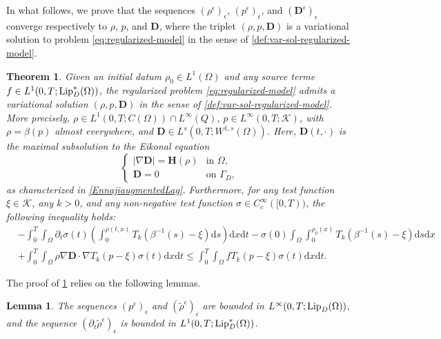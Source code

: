 \documentclass[final,reqno]{amsart}
\theoremstyle{plain}
\newtheorem{theorem}{Theorem}	%
\newtheorem{lemma}{Lemma}	%
\theoremstyle{definition}
\theoremstyle{remark}
\numberwithin{remark}{section}	%
\numberwithin{example}{section}	%
\newcommand{\de}{\mathbf{D}}
\newcommand{\he}{\mathbf{H}}
\newcommand{\K}{\mathcal K}
\newcommand{\Om}{\Omega}
\newcommand{\Lip}{\textup{Lip}}
\newcommand{\dd}{\mathrm{d}}
\begin{document}
In what follows, we prove that the sequences $(\rho^\epsilon)_{\epsilon}$, $(p^\epsilon)_{\epsilon}$, and $(\de^\epsilon)_{\epsilon}$ converge respectively to $\rho$, $p$, and $\de$, where the triplet $(\rho,p,\de)$ is a variational solution to problem \eqref{eq:regularized-model} in the sense of \cref{def:var-sol-regularized-model}.
\begin{theorem}\label{thm:th2}
     Given an initial datum $\rho_0\in L^{1}(\Om)$ and any source terme $f\in L^{1}(0,T;\Lip_{D}^{*}(\Om))$, the regularized problem \eqref{eq:regularized-model} admits a variational solution $(\rho, p, \de)$ in the sense of \cref{def:var-sol-regularized-model}. More precisely, $\rho \in L^1(0,T; C(\Omega)) \cap L^\infty(Q)$, $p \in L^\infty(0,T; \K)$, with $\rho = \beta(p)$ almost everywhere, and $\de \in L^s(0,T; W^{1,s}(\Omega))$. 
    Here, $\de(t, \cdot)$ is the maximal subsolution to the Eikonal equation
    \begin{equation}\label{eq:eikonal}
        \begin{cases}
            \vert \nabla \de \vert = \he(\rho) & \text{in } \Om,\\
            \de = 0 & \text{on } \Gamma_D,
        \end{cases}
    \end{equation}
    as characterized in \cref{EnnajiaugmentedLag}. Furthermore, for any test function $\xi \in \K$, any $k > 0$, and any non-negative test function $\sigma \in C^{\infty}_{c}([0,T))$, the following inequality holds:
    \begin{equation}\label{eq:evol1}
        \begin{aligned}
            &-\int_{0}^{T} \int_{\Omega} \partial_t \sigma(t) \left( \int_{0}^{\rho(t,x)} T_k(\beta^{-1}(s)-\xi) \dd s \right) \dd x \dd t - \sigma(0) \int_{\Omega}\int_{0}^{\rho_0(x)} T_k(\beta^{-1}(s)-\xi) \dd s \dd x\\
            &+ \int_{0}^{T} \int_{\Omega} \rho \nabla \de \cdot \nabla T_k(p-\xi) \sigma(t) \dd x \dd t \le \int_{0}^{T} \int_{\Om} f T_k(p-\xi) \sigma(t) \dd x \dd t.
        \end{aligned}
    \end{equation}
\end{theorem}

The proof of \cref{thm:th2} relies on the following lemmas.
\begin{lemma}\label{lem:rho}
    The sequences $(p^\epsilon)_{\epsilon}$ and $(\tilde{\rho}^{\epsilon})_{\epsilon}$ are bounded in $L^{\infty}(0,T; \Lip_{D}(\Omega))$, and the sequence $(\partial_t \tilde{\rho}^{\epsilon})_{\epsilon}$ is bounded in $L^1(0,T; \Lip_{D}^*(\Om))$.
\end{lemma}
\end{document}
